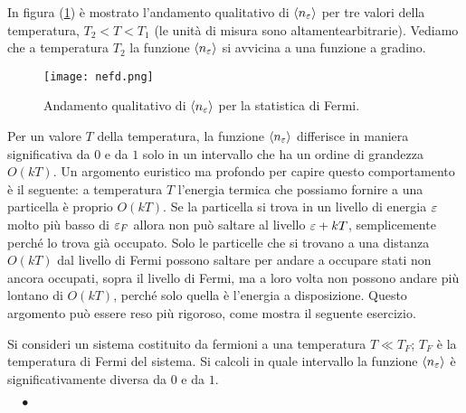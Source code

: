 In figura (\ref{fig:nefd}) è mostrato l'andamento qualitativo di $\langle n_\varepsilon\rangle$ per
tre valori della temperatura, $T_2 < T < T_1$ (le unità di misura sono
altamentearbitrarie). Vediamo che a temperatura $T_2$ la funzione $\langle n_\varepsilon\rangle$ si
avvicina a
una funzione a gradino.
\begin{figure}[!ht]
	\centering
	\texttt{[image: nefd.png]}
	\caption{Andamento qualitativo di $\langle n_\varepsilon\rangle$ per la statistica di Fermi.}
	\label{fig:nefd}
\end{figure}
\noindent
Per un valore $T$ della temperatura, la funzione $\langle n_\varepsilon\rangle$ differisce in maniera
significativa da $0$ e da $1$ solo in un intervallo che ha un ordine di
grandezza $O(kT)$. Un argomento euristico ma profondo per capire questo
comportamento è il seguente: a temperatura $T$ l'energia termica che possiamo
fornire a una particella è proprio $O(kT)$. Se la particella si trova in un
livello di energia $\varepsilon$ molto più basso di $\varepsilon_F$ allora non può saltare al
livello $\varepsilon+kT$, semplicemente perché lo trova già occupato. Solo le
particelle che si trovano a una distanza $O(kT)$ dal livello di Fermi possono
saltare per andare a occupare stati non ancora occupati, sopra il livello di
Fermi, ma a loro volta non possono andare più lontano di $O(kT)$, perché solo
quella è l'energia a disposizione. Questo argomento può essere reso più
rigoroso, come mostra il seguente esercizio.
\begin{Exercise}
Si consideri un sistema costituito da fermioni a una temperatura $T \ll T_F$;
$T_F$ è la temperatura di Fermi del sistema. Si calcoli in quale intervallo la
funzione $\langle n_\varepsilon\rangle$ è significativamente diversa da $0$ e da $1$.

$\quad\bullet$
\end{Exercise}

